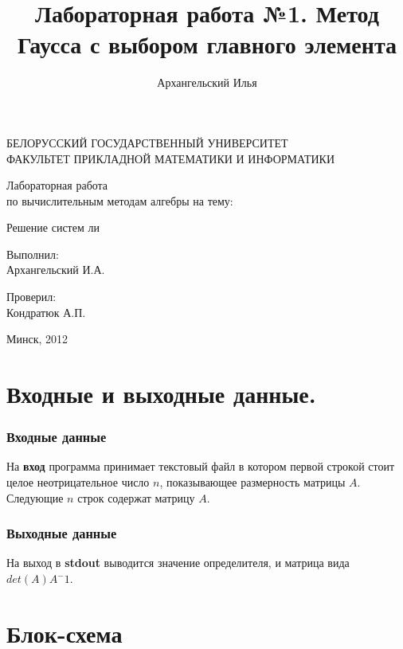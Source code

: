 \documentclass[a4paper,11pt]{article}
\title{Лабораторная работа №1. Метод Гаусса с выбором главного элемента}
\author{Архангельский Илья}
\begin{document}
\begin{titlepage}
	\begin{center}
		БЕЛОРУССКИЙ ГОСУДАРСТВЕННЫЙ УНИВЕРСИТЕТ \\
		ФАКУЛЬТЕТ ПРИКЛАДНОЙ МАТЕМАТИКИ И ИНФОРМАТИКИ
	\end{center}
	\vspace{10em}
	\begin{center}
		\LARGE {Лабораторная работа \\
		по вычислительным методам алгебры на тему:}
		\linebreak	 
		
		Решение систем ли
	\end{center}
	\vspace{3em}
	\begin{flushright}
	  
	
 	Выполнил: \\	Архангельский И.А. \\ 
 	
 	  \vspace{1em}
 	
 	  Проверил: \\ Кондратюк А.П. \\
 	
	\end{flushright}
	
	\vfill
	\begin{center}
		Минск, 2012
	\end{center}
\end{titlepage} 

\newpage
\part*{Входные и выходные данные.} 
\section*{Входные данные}
На \textbf{вход} программа принимает текстовый файл в котором первой строкой стоит целое неотрицательное число $n$, показывающее размерность матрицы $A$. Следующие $n$ строк содержат матрицу $A$. 
\section*{Выходные данные}
На выход в \textbf{stdout} выводится значение определителя, и матрица вида $det(A) A^-1$.
\newpage
\part*{Блок-схема} 
\end{document}
